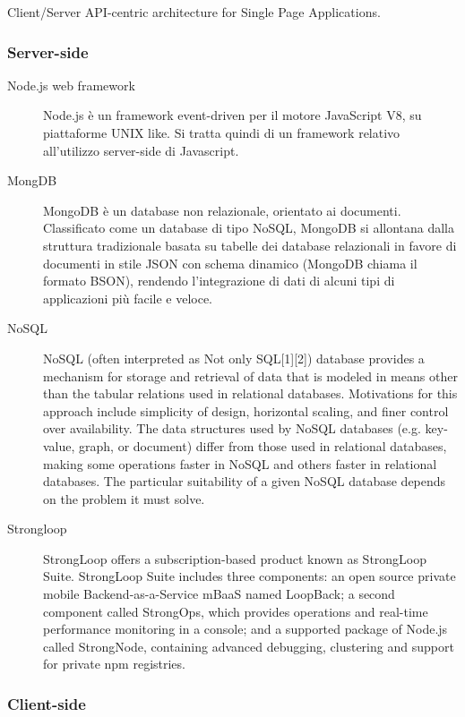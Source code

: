 \documentclass{sig-alternate}
\begin{document}
Client/Server API-centric architecture for Single Page Applications.

\subsubsection{Server-side}

\begin{description}
       \item[Node.js web framework] Node.js è un framework event-driven per il motore JavaScript V8, su piattaforme UNIX like. Si tratta quindi di un framework relativo all'utilizzo server-side di Javascript.
       \item[MongDB]
       MongoDB è un database non relazionale, orientato ai documenti. Classificato come un database di tipo NoSQL, MongoDB si allontana dalla struttura tradizionale basata su tabelle dei database relazionali in favore di documenti in stile JSON con schema dinamico (MongoDB chiama il formato BSON), rendendo l'integrazione di dati di alcuni tipi di applicazioni più facile e veloce.
       \item[NoSQL]
       NoSQL (often interpreted as Not only SQL[1][2]) database provides a mechanism for storage and retrieval of data that is modeled in means other than the tabular relations used in relational databases. Motivations for this approach include simplicity of design, horizontal scaling, and finer control over availability. The data structures used by NoSQL databases (e.g. key-value, graph, or document) differ from those used in relational databases, making some operations faster in NoSQL and others faster in relational databases. The particular suitability of a given NoSQL database depends on the problem it must solve. 
       \item[Strongloop]
       StrongLoop offers a subscription-based product known as StrongLoop Suite. StrongLoop Suite includes three components: an open source private mobile Backend-as-a-Service mBaaS named LoopBack; a second component called StrongOps, which provides operations and real-time performance monitoring in a console; and a supported package of Node.js called StrongNode, containing advanced debugging, clustering and support for private npm registries.
\end{description}

\subsubsection{Client-side}
\end{document}
